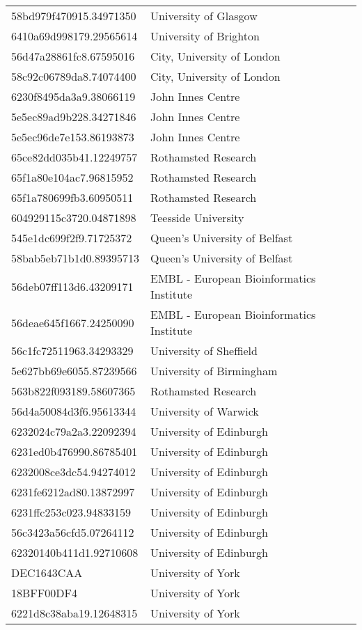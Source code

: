 \begin{tabular}{ll}
58bd979f470915.34971350 & University of Glasgow \\
6410a69d998179.29565614 & University of Brighton \\
56d47a28861fc8.67595016 & City, University of London \\
58c92c06789da8.74074400 & City, University of London \\
6230f8495da3a9.38066119 & John Innes Centre \\
5e5ec89ad9b228.34271846 & John Innes Centre \\
5e5ec96de7e153.86193873 & John Innes Centre \\
65ce82dd035b41.12249757 & Rothamsted Research \\
65f1a80e104ac7.96815952 & Rothamsted Research \\
65f1a780699fb3.60950511 & Rothamsted Research \\
604929115c3720.04871898 & Teesside University \\
545e1dc699f2f9.71725372 & Queen's University of Belfast \\
58bab5eb71b1d0.89395713 & Queen's University of Belfast \\
56deb07ff113d6.43209171 & EMBL - European Bioinformatics Institute \\
56deae645f1667.24250090 & EMBL - European Bioinformatics Institute \\
56c1fc72511963.34293329 & University of Sheffield \\
5e627bb69e6055.87239566 & University of Birmingham \\
563b822f093189.58607365 & Rothamsted Research \\
56d4a50084d3f6.95613344 & University of Warwick \\
6232024c79a2a3.22092394 & University of Edinburgh \\
6231ed0b476990.86785401 & University of Edinburgh \\
6232008ce3dc54.94274012 & University of Edinburgh \\
6231fe6212ad80.13872997 & University of Edinburgh \\
6231ffc253c023.94833159 & University of Edinburgh \\
56c3423a56cfd5.07264112 & University of Edinburgh \\
62320140b411d1.92710608 & University of Edinburgh \\
DEC1643CAA & University of York \\
18BFF00DF4 & University of York \\
6221d8c38aba19.12648315 & University of York \\

\end{tabular}
